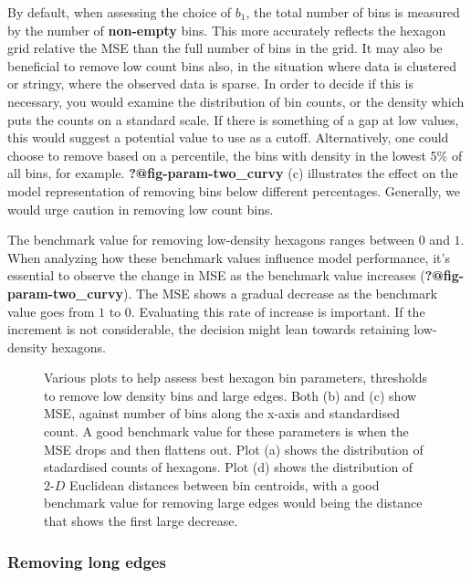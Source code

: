 \documentclass[
  12pt]{article}
\begin{document}
By default, when assessing the choice of \(b_1\), the total number of
bins is measured by the number of \textbf{non-empty} bins. This more
accurately reflects the hexagon grid relative the MSE than the full
number of bins in the grid. It may also be beneficial to remove low
count bins also, in the situation where data is clustered or stringy,
where the observed data is sparse. In order to decide if this is
necessary, you would examine the distribution of bin counts, or the
density which puts the counts on a standard scale. If there is something
of a gap at low values, this would suggest a potential value to use as a
cutoff. Alternatively, one could choose to remove based on a percentile,
the bins with density in the lowest 5\% of all bins, for example.
\textbf{?@fig-param-two\_curvy} (c) illustrates the effect on the model
representation of removing bins below different percentages. Generally,
we would urge caution in removing low count bins.

The benchmark value for removing low-density hexagons ranges between
\(0\) and \(1\). When analyzing how these benchmark values influence
model performance, it's essential to observe the change in MSE as the
benchmark value increases (\textbf{?@fig-param-two\_curvy}). The MSE
shows a gradual decrease as the benchmark value goes from \(1\) to
\(0\). Evaluating this rate of increase is important. If the increment
is not considerable, the decision might lean towards retaining
low-density hexagons.

\begin{figure}[H]


\caption{\label{fig-param-two-curvy}Various plots to help assess best
hexagon bin parameters, thresholds to remove low density bins and large
edges. Both (b) and (c) show MSE, against number of bins along the
x-axis and standardised count. A good benchmark value for these
parameters is when the MSE drops and then flattens out. Plot (a) shows
the distribution of stadardised counts of hexagons. Plot (d) shows the
distribution of \(2\text{-}D\) Euclidean distances between bin
centroids, with a good benchmark value for removing large edges would
being the distance that shows the first large decrease.}

\end{figure}%

\subsubsection{Removing long edges}\label{removing-long-edges}
\end{document}
